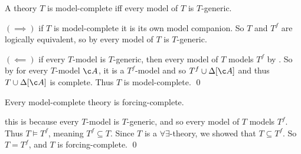 \bthrm

    A theory $T$ is model-complete iff every model of $T$ is $T$-generic.

\ethrm

\Proof $(\implies)$ if $T$ is model-complete it is its own model companion.
So $T$ and $T^f$ are logically equivalent, so by  every model of $T$ is $T$-generic.

$(\impliedby)$ if every $T$-model is $T$-generic, then every model of $T$ models $T^f$ by .
So by  for every $T$-model $\c A$, it is a $T^f$-model and so $T^f\cup\Delta[\c A]$ and thus $T\cup\Delta[\c A]$ is complete.
Thus $T$ is model-complete.
\qed

\bcoro

    Every model-complete theory is forcing-complete.

\ecoro

\Proof this is because every $T$-model is $T$-generic, and so every model of $T$ models $T^f$.
Thus $T\vDash T^f$, meaning $T^f\subseteq T$.
Since $T$ is a $\forall\exists$-theory, we showed that $T\subseteq T^f$.
So $T=T^f$, and $T$ is forcing-complete.
\qed

